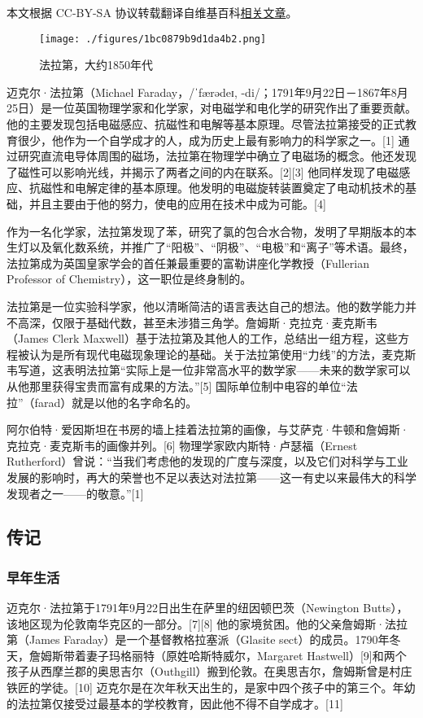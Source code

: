 
本文根据 CC-BY-SA 协议转载翻译自维基百科\href{https://en.wikipedia.org/wiki/Michael_Faraday}{相关文章}。
\begin{figure}[ht]
\centering
\texttt{[image: ./figures/1bc0879b9d1da4b2.png]}
\caption{法拉第，大约1850年代} \label{fig_FLD_3}
\end{figure}
迈克尔·法拉第（Michael Faraday，/ˈfærədeɪ, -di/；1791年9月22日－1867年8月25日）是一位英国物理学家和化学家，对电磁学和电化学的研究作出了重要贡献。他的主要发现包括电磁感应、抗磁性和电解等基本原理。尽管法拉第接受的正式教育很少，他作为一个自学成才的人，成为历史上最有影响力的科学家之一。[1] 通过研究直流电导体周围的磁场，法拉第在物理学中确立了电磁场的概念。他还发现了磁性可以影响光线，并揭示了两者之间的内在联系。[2][3] 他同样发现了电磁感应、抗磁性和电解定律的基本原理。他发明的电磁旋转装置奠定了电动机技术的基础，并且主要由于他的努力，使电的应用在技术中成为可能。[4]

作为一名化学家，法拉第发现了苯，研究了氯的包合水合物，发明了早期版本的本生灯以及氧化数系统，并推广了“阳极”、“阴极”、“电极”和“离子”等术语。最终，法拉第成为英国皇家学会的首任兼最重要的富勒讲座化学教授（Fullerian Professor of Chemistry），这一职位是终身制的。

法拉第是一位实验科学家，他以清晰简洁的语言表达自己的想法。他的数学能力并不高深，仅限于基础代数，甚至未涉猎三角学。詹姆斯·克拉克·麦克斯韦（James Clerk Maxwell）基于法拉第及其他人的工作，总结出一组方程，这些方程被认为是所有现代电磁现象理论的基础。关于法拉第使用“力线”的方法，麦克斯韦写道，这表明法拉第“实际上是一位非常高水平的数学家——未来的数学家可以从他那里获得宝贵而富有成果的方法。”[5] 国际单位制中电容的单位“法拉”（farad）就是以他的名字命名的。

阿尔伯特·爱因斯坦在书房的墙上挂着法拉第的画像，与艾萨克·牛顿和詹姆斯·克拉克·麦克斯韦的画像并列。[6] 物理学家欧内斯特·卢瑟福（Ernest Rutherford）曾说：“当我们考虑他的发现的广度与深度，以及它们对科学与工业发展的影响时，再大的荣誉也不足以表达对法拉第——这一有史以来最伟大的科学发现者之一——的敬意。”[1]
\subsection{传记}
\subsubsection{早年生活}
迈克尔·法拉第于1791年9月22日出生在萨里的纽因顿巴茨（Newington Butts），该地区现为伦敦南华克区的一部分。[7][8] 他的家境贫困。他的父亲詹姆斯·法拉第（James Faraday）是一个基督教格拉塞派（Glasite sect）的成员。1790年冬天，詹姆斯带着妻子玛格丽特（原姓哈斯特威尔，Margaret Hastwell）[9]和两个孩子从西摩兰郡的奥思吉尔（Outhgill）搬到伦敦。在奥思吉尔，詹姆斯曾是村庄铁匠的学徒。[10] 迈克尔是在次年秋天出生的，是家中四个孩子中的第三个。年幼的法拉第仅接受过最基本的学校教育，因此他不得不自学成才。[11]

